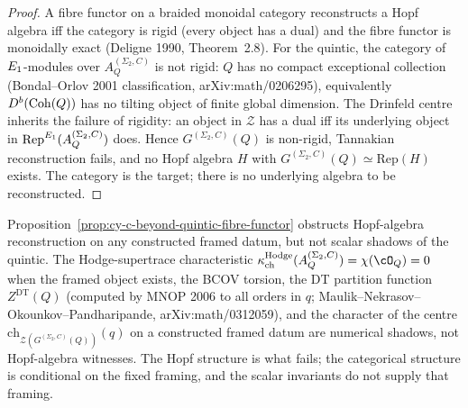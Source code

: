 \begin{proof}
A fibre functor on a braided monoidal category reconstructs a Hopf algebra iff the
category is rigid (every object has a dual) and the fibre functor is monoidally exact
(Deligne 1990, Theorem~2.8). For the quintic, the category of $E_{1}$-modules over
$A_Q^{(\Sigma_2,C)}$ is not rigid: $Q$ has no compact exceptional collection
(Bondal--Orlov 2001 classification, arXiv:math/0206295), equivalently $D^b(\mathrm{Coh}(Q))$ has
no tilting object of finite global dimension. The Drinfeld centre inherits the failure
of rigidity: an object in $\mathcal{Z}$ has a dual iff its underlying object in
$\mathrm{Rep}^{E_{1}}(A_Q^{(\Sigma_2,C)})$ does. Hence
$G^{(\Sigma_2,C)}(Q)$ is non-rigid, Tannakian reconstruction fails, and
no Hopf algebra $H$ with $G^{(\Sigma_2,C)}(Q) \simeq \mathrm{Rep}(H)$
exists. The category is the target; there is no underlying algebra to be
reconstructed.
\end{proof}

\begin{remark}
\label{rem:cy-c-beyond-quintic-computable}
Proposition~\ref{prop:cy-c-beyond-quintic-fibre-functor} obstructs Hopf-algebra
reconstruction on any constructed framed datum, but not scalar shadows of the
quintic. The Hodge-supertrace characteristic
$\kappa_{\mathrm{ch}}^{\mathrm{Hodge}}(A_Q^{(\Sigma_2,C)}) = \chi(\cO_Q)=0$
when the framed object exists, the BCOV torsion, the DT partition function $Z^{\mathrm{DT}}(Q)$
(computed by MNOP 2006 to all orders in $q$; Maulik--Nekrasov--Okounkov--Pandharipande,
arXiv:math/0312059), and the character of the centre
$\mathrm{ch}_{\mathcal{Z}(G^{(\Sigma_2,C)}(Q))}(q)$ on a constructed framed
datum are numerical shadows, not Hopf-algebra witnesses. The Hopf structure is
what fails; the categorical structure is conditional on the fixed framing, and the
scalar invariants do not supply that framing.
\end{remark}

